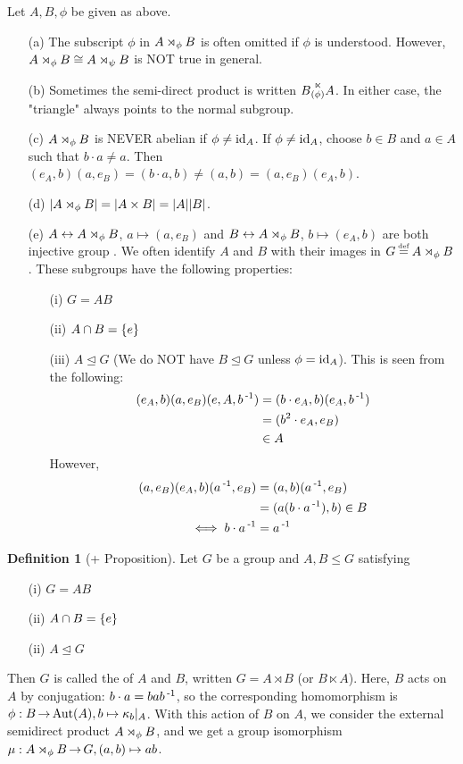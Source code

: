\documentclass[11pt]{book}
\theoremstyle{definition}   \newtheorem{defn}[counter]{Definition} %
\newcommand{\nsg}{\mathrel{\unlhd}}   \newcommand{\ind}{\parindent24pt}   \newcommand{\vn}{\varnothing}
\newcommand{\lra}{\leftrightarrow}   \newcommand{\0}{\mathbf{0}}   \newcommand{\mc}[1]{\mathcal{#1}}   \newcommand{\hra}{\hookrightarrow}   \newcommand{\hla}{\hookleftarrow}
\newcommand\myeq{\mathrel{\overset{\makebox[0pt]{\mbox{\normalfont\tiny\sffamily \textrm{def}}}}{=}}}
\DeclareMathOperator{\ra}{\rightarrow}   \DeclareMathOperator{\Poly}{\mathbf{P}}   \DeclareMathOperator{\spn}{\textnormal{span}}   \DeclareMathOperator{\aut}{\textnormal{Aut}}
\newcommand{\vs}{\vspace{8pt}}
\numberwithin{counter}{chapter}
\begin{document}
\begin{remark}
Let $A,B,\phi$ be given as above.
\begin{enumerate}
\item[(a)] The subscript $\phi$ in $A\rtimes_{\phi} B$ is often omitted if $\phi$ is understood. However, $A\rtimes_{\phi} B \cong A\rtimes_{\psi}B$ is NOT true in general.
\item[(b)] Sometimes the semi-direct product is written $B \overset{{\huge \ltimes}}{\null_{\tiny (\phi)}} A$. In either case, the "triangle" always points to the normal subgroup.
\item[(c)] $A \rtimes_{\phi}B$ is NEVER abelian if $\phi \ne \textnormal{id}_A$. If $\phi \ne \textnormal{id}_A$, choose $b \in B$ and $a \in A$ such that $b\cdot a \ne a$. Then $(e_A,b)(a,e_B) = (b\cdot a,b) \ne (a,b) = (a,e_B)(e_A,b)$.
\item[(d)] $|A\rtimes_{\phi}B| = |A\times B| = |A| |B|$.
\item[(e)] $A \lra A\sd{\phi}B$, $a \mapsto (a,e_B)$ and $B \lra A\sd{\phi}B$, $b \mapsto (e_A,b)$ are both injective group \hms. We often identify $A$ and $B$ with their images in $G \myeq A\sd{\phi}B$. These subgroups have the following properties:
	\begin{enumerate}
	\item[(i)] $G = AB$
	\item[(ii)] $A\cap B = \{e\}$
	\item[(iii)] $A \nsg G$ (We do NOT have $B \nsg G$ unless $\phi = \textnormal{id}_A$). This is seen from the following:
		\begin{align*}
		(e_A,b)(a,e_B)(e,A,b\operatorname{^{-1}}) &= (b\cdot e_A,b)(e_A,b\operatorname{^{-1}}) \\
		&= (b^2 \cdot e_A,e_B) \\
		&\in A
		\end{align*}
	However,
		\begin{align*}
		(a,e_B)(e_A,b)(a\operatorname{^{-1}},e_B) &= (a,b)(a\operatorname{^{-1}},e_B) \\
		&= (a(b\cdot a\operatorname{^{-1}}),b) \in B \\
		\iff b\cdot a\operatorname{^{-1}} &= a\operatorname{^{-1}}
		\end{align*}
	\end{enumerate}
\end{enumerate}
\end{remark}

\vs

\begin{defn}[+ Proposition]
Let $G$ be a group and $A,B \leq G$ satisfying
	\begin{enumerate}
	\item[(i)] $G = AB$
	\item[(ii)] $A\cap B = \{e\}$
	\item[(ii)] $A \nsg G$
	\end{enumerate}
Then $G$ is called the  of $A$ and $B$, written $G = A \rtimes B$ (or $B \ltimes A$). Here, $B$ acts on $A$ by conjugation: $b\cdot a = bab\operatorname{^{-1}}$, so the corresponding homomorphism is $\phi : B \ra \aut(A), b \mapsto \kappa_b|_A$. With this action of $B$ on $A$, we consider the external semidirect product $A\rtimes_{\phi}B$, and we get a group isomorphism $\mu : A \sd{\phi}B \ra G, (a,b) \mapsto ab$.
\end{defn}
\end{document}
